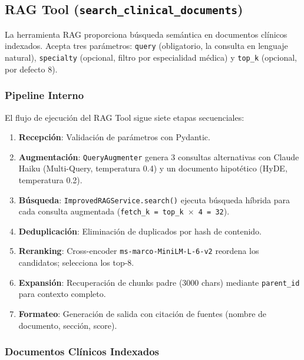 \subsection{RAG Tool (\texttt{search\_clinical\_documents})}
\label{sec:appendix_ragtool}

La herramienta \ac{RAG} proporciona búsqueda semántica en documentos clínicos indexados. Acepta tres parámetros: \texttt{query} (obligatorio, la consulta en lenguaje natural), \texttt{specialty} (opcional, filtro por especialidad médica) y \texttt{top\_k} (opcional, por defecto 8).

\subsubsection{Pipeline Interno}

El flujo de ejecución del \ac{RAG} Tool sigue siete etapas secuenciales:

\begin{enumerate}[nosep, leftmargin=*]
  \item \textbf{Recepción}: Validación de parámetros con Pydantic.
  \item \textbf{Augmentación}: \texttt{QueryAugmenter} genera 3 consultas alternativas con Claude Haiku (Multi-Query, temperatura 0.4) y un documento hipotético (\ac{HyDE}, temperatura 0.2).
  \item \textbf{Búsqueda}: \texttt{ImprovedRAGService.search()} ejecuta búsqueda híbrida para cada consulta augmentada (\texttt{fetch\_k = top\_k $\times$ 4 = 32}).
  \item \textbf{Deduplicación}: Eliminación de duplicados por hash de contenido.
  \item \textbf{Reranking}: Cross-encoder \texttt{ms-marco-MiniLM-L-6-v2} reordena los candidatos; selecciona los top-8.
  \item \textbf{Expansión}: Recuperación de chunks padre (3000 chars) mediante \texttt{parent\_id} para contexto completo.
  \item \textbf{Formateo}: Generación de salida con citación de fuentes (nombre de documento, sección, score).
\end{enumerate}

\subsubsection{Documentos Clínicos Indexados}

